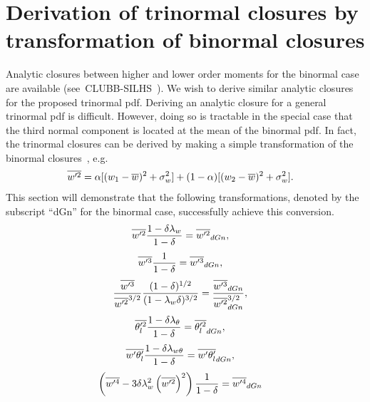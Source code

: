 \section{Derivation of trinormal closures by transformation of binormal closures}
\label{sec:derivation-of-trinormal-closures-by-transformation-of-binormal-closures}

Analytic closures between higher and lower order moments for the binormal case
are available (see~CLUBB-SILHS~\autocite{larson2022clubbsilhs}).
We wish to derive similar analytic closures for the proposed trinormal \gls{pdf}.
Deriving an analytic closure for a general trinormal \gls{pdf} is difficult.
However, doing so is tractable in the special case that the third normal component
is located at the mean of the binormal \gls{pdf}.
In fact, the trinormal closures can be derived
by making a simple transformation of the binormal closures~\autocite{larson2005using},
e.g.
\begin{align}
    \label{eq:wp2_bar_dGn}
    \overline{w'^2}
    &= \alpha [(w_1 - \overline{w})^2 + \sigma_w^2]
    + (1 - \alpha) [(w_2 - \overline{w})^2 + \sigma_w^2].
\end{align}
This section will demonstrate that the following transformations,
denoted by the subscript \enquote{dGn} for the binormal case,
successfully achieve this conversion.
\begin{align}
    \label{eq:w_prime_2_transform}
    \overline{w'^2} \frac{1 - \delta\lambda_w}{1 - \delta}
    &= \overline{w'^2}_{dGn},
\end{align}
\begin{align}
    \label{eq:w_prime_3_transform}
    \overline{w'^3} \frac{1}{1 - \delta}
    &= \overline{w'^3}_{dGn},
\end{align}
\begin{align}
    \label{eq:w_prime_3_div_w_prime_2_transform}
    \frac{\overline{w'^3}}{\overline{w'^2}^{3/2}} \frac{(1 - \delta)^{1/2}}{(1 - \lambda_w\delta)^{3/2}}
    &= \frac{\overline{w'^3}_{dGn}}{\overline{w'^2}_{dGn}^{3/2}},
\end{align}
\begin{align}
    \label{eq:theta_l_prime_transform}
    \overline{\theta_l'^2} \frac{1 - \delta\lambda_\theta}{1 - \delta}
    &= \overline{\theta_l'^2}_{dGn},
\end{align}
\begin{align}
    \label{eq:w_prime_theta_l_prime_transform}
    \overline{w' \theta_l'} \frac{1 - \delta\lambda_{w\theta}}{1 - \delta}
    &= \overline{w' \theta_l'}_{dGn},
\end{align}
\begin{align}
    \label{eq:w_prime_4_transform}
    \left(\overline{w'^4} - 3\delta\lambda_w^2 \left(\overline{w'^2}\right)^2\right) \frac{1}{1 - \delta}
    &= \overline{w'^4}_{dGn}
\end{align}
